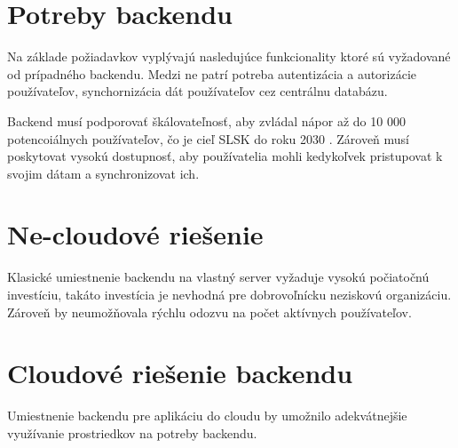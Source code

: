 \section{Potreby backendu}
Na základe požiadavkov vyplývajú nasledujúce funkcionality ktoré sú vyžadované od prípadného backendu. Medzi ne patrí potreba autentizácia a autorizácie používateľov, synchornizácia dát používateľov cez centrálnu databázu.

Backend musí podporovať škálovateľnosť, aby zvládal nápor až do 10 000 potencoiálnych používateľov, čo je cieľ SLSK do roku 2030 \cite{noauthor_vyrocna_nodate}. Zároveň musí poskytovat vysokú dostupnosť, aby používatelia mohli kedykoľvek pristupovat k svojim dátam a synchronizovat ich.

\section{Ne-cloudové riešenie}
Klasické umiestnenie backendu na vlastný server vyžaduje vysokú počiatočnú investíciu, takáto investícia je nevhodná pre dobrovoľnícku neziskovú organizáciu. Zároveň by neumožňovala rýchlu odozvu na počet aktívnych používateľov.


\section{Cloudové riešenie backendu}
Umiestnenie backendu pre aplikáciu do cloudu by umožnilo adekvátnejšie využívanie prostriedkov na potreby backendu. 











